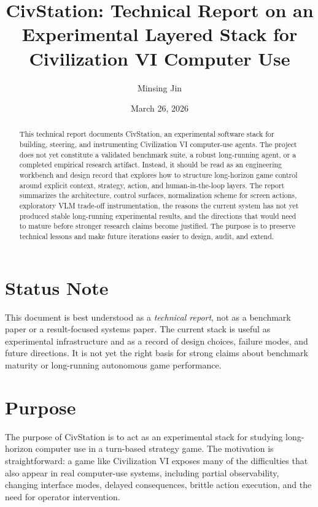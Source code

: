 \documentclass[11pt]{article}
\title{CivStation: Technical Report on an Experimental Layered Stack for Civilization VI Computer Use}
\author{Minsing Jin}
\date{March 26, 2026}
\begin{document}
\maketitle

\begin{abstract}
This technical report documents CivStation, an experimental software stack for building, steering, and instrumenting Civilization VI computer-use agents. The project does not yet constitute a validated benchmark suite, a robust long-running agent, or a completed empirical research artifact. Instead, it should be read as an engineering workbench and design record that explores how to structure long-horizon game control around explicit context, strategy, action, and human-in-the-loop layers. The report summarizes the architecture, control surfaces, normalization scheme for screen actions, exploratory VLM trade-off instrumentation, the reasons the current system has not yet produced stable long-running experimental results, and the directions that would need to mature before stronger research claims become justified. The purpose is to preserve technical lessons and make future iterations easier to design, audit, and extend.
\end{abstract}

\section{Status Note}

This document is best understood as a \emph{technical report}, not as a benchmark paper or a result-focused systems paper. The current stack is useful as experimental infrastructure and as a record of design choices, failure modes, and future directions. It is not yet the right basis for strong claims about benchmark maturity or long-running autonomous game performance.

\section{Purpose}

The purpose of CivStation is to act as an experimental stack for studying long-horizon computer use in a turn-based strategy game. The motivation is straightforward: a game like Civilization VI exposes many of the difficulties that also appear in real computer-use systems, including partial observability, changing interface modes, delayed consequences, brittle action execution, and the need for operator intervention.
\end{document}
